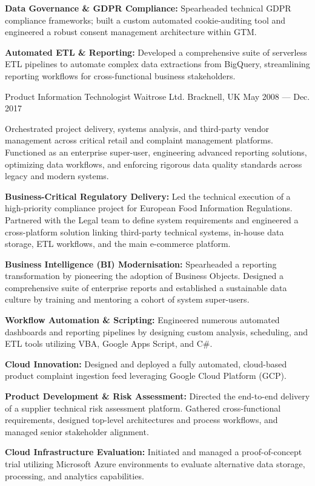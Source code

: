\begin{cventries}
{\begin{cvitems}
      \item {\textbf{Data Governance \& GDPR Compliance:} Spearheaded technical GDPR compliance frameworks; built a custom automated cookie-auditing tool and engineered a robust consent management architecture within GTM.}
      \item {\textbf{Automated ETL \& Reporting:} Developed a comprehensive suite of serverless ETL pipelines to automate complex data extractions from BigQuery, streamlining reporting workflows for cross-functional business stakeholders.}
    \end{cvitems}
  }

  \cventry
  {Product Information Technologist} %
  {Waitrose Ltd. } %
  {Bracknell, UK} %
  {May 2008 --- Dec. 2017} %
  {
    \begin{cvitems} %
      \item {Orchestrated project delivery, systems analysis, and third-party vendor management across critical retail and complaint management platforms. Functioned as an enterprise super-user, engineering advanced reporting solutions, optimizing data workflows, and enforcing rigorous data quality standards across legacy and modern systems.}
      \item {\textbf{Business-Critical Regulatory Delivery:} Led the technical execution of a high-priority compliance project for European Food Information Regulations. Partnered with the Legal team to define system requirements and engineered a cross-platform solution linking third-party technical systems, in-house data storage, ETL workflows, and the main e-commerce platform.}
      \item {\textbf{Business Intelligence (BI) Modernisation:} Spearheaded a reporting transformation by pioneering the adoption of Business Objects. Designed a comprehensive suite of enterprise reports and established a sustainable data culture by training and mentoring a cohort of system super-users.}
      \item {\textbf{Workflow Automation \& Scripting:} Engineered numerous automated dashboards and reporting pipelines by designing custom analysis, scheduling, and ETL tools utilizing VBA, Google Apps Script, and C\#.}
      \item {\textbf{Cloud Innovation:} Designed and deployed a fully automated, cloud-based product complaint ingestion feed leveraging Google Cloud Platform (GCP).}
      \item {\textbf{Product Development \& Risk Assessment:} Directed the end-to-end delivery of a supplier technical risk assessment platform. Gathered cross-functional requirements, designed top-level architectures and process workflows, and managed senior stakeholder alignment.}
      \item {\textbf{Cloud Infrastructure Evaluation:} Initiated and managed a proof-of-concept trial utilizing Microsoft Azure environments to evaluate alternative data storage, processing, and analytics capabilities.}
    \end{cvitems}
  }


\end{cventries}
